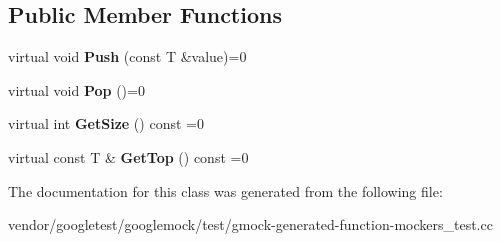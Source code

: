 \subsection*{Public Member Functions}
\begin{DoxyCompactItemize}
\item 
\mbox{\label{classtesting_1_1gmock__generated__function__mockers__test_1_1_stack_interface_a49448f6195021fee947d37b80b6e5d30}} 
virtual void {\bfseries Push} (const T \&value)=0
\item 
\mbox{\label{classtesting_1_1gmock__generated__function__mockers__test_1_1_stack_interface_a1a6646d1d9febe90c607b9b3e4539b67}} 
virtual void {\bfseries Pop} ()=0
\item 
\mbox{\label{classtesting_1_1gmock__generated__function__mockers__test_1_1_stack_interface_a537ec8647a2333f50e5f923a85b90eba}} 
virtual int {\bfseries Get\+Size} () const =0
\item 
\mbox{\label{classtesting_1_1gmock__generated__function__mockers__test_1_1_stack_interface_af36e32b9ae568100363466d1ebf95364}} 
virtual const T \& {\bfseries Get\+Top} () const =0
\end{DoxyCompactItemize}


The documentation for this class was generated from the following file\+:\begin{DoxyCompactItemize}
\item 
vendor/googletest/googlemock/test/gmock-\/generated-\/function-\/mockers\+\_\+test.\+cc\end{DoxyCompactItemize}
